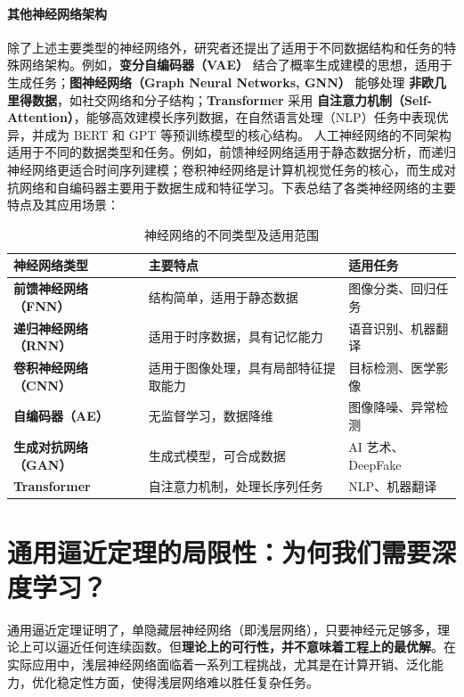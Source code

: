 \paragraph*{其他神经网络架构}
除了上述主要类型的神经网络外，研究者还提出了适用于不同数据结构和任务的特殊网络架构。例如，{\bf 变分自编码器（VAE）} 结合了概率生成建模的思想，适用于生成任务；{\bf 图神经网络（Graph Neural Networks, GNN）} 能够处理 {\bf 非欧几里得数据}，如社交网络和分子结构；{\bf Transformer }采用 {\bf 自注意力机制（Self-Attention）}，能够高效建模长序列数据，在自然语言处理（NLP）任务中表现优异，并成为 BERT 和 GPT 等预训练模型的核心结构。
人工神经网络的不同架构适用于不同的数据类型和任务。例如，前馈神经网络适用于静态数据分析，而递归神经网络更适合时间序列建模；卷积神经网络是计算机视觉任务的核心，而生成对抗网络和自编码器主要用于数据生成和特征学习。下表总结了各类神经网络的主要特点及其应用场景：
\begin{table}[htbp]
\centering
\caption{神经网络的不同类型及适用范围}
\small
\begin{tabular}{|p{3.5cm}|p{5cm}|p{4cm}|}
\hline
{\bf  神经网络类型} & {\bf  主要特点 } & {\bf 适用任务}  \\
\hline
{\bf 前馈神经网络（FNN）} &  结构简单，适用于静态数据  &  图像分类、回归任务  \\
\hline
{\bf 递归神经网络（RNN）}  &  适用于时序数据，具有记忆能力& 语音识别、机器翻译 \\
\hline
{\bf 卷积神经网络（CNN）}  & 适用于图像处理，具有局部特征提取能力&  目标检测、医学影像 \\
\hline
{\bf 自编码器（AE）}  &  无监督学习，数据降维 &  图像降噪、异常检测\\
\hline
{\bf 生成对抗网络（GAN）}  &  生成式模型，可合成数据 &  AI 艺术、DeepFake\\
\hline
{\bf Transformer}  &  自注意力机制，处理长序列任务  &  NLP、机器翻译\\
\hline
\end{tabular}
\label{神经网络的不同类型及适用范围}
\end{table}
\section{通用逼近定理的局限性：为何我们需要深度学习？}
通用逼近定理证明了，单隐藏层神经网络（即浅层网络），只要神经元足够多，理论上可以逼近任何连续函数。但{\bf 理论上的可行性，并不意味着工程上的最优解}。在实际应用中，浅层神经网络面临着一系列工程挑战，尤其是在计算开销、泛化能力，优化稳定性方面，使得浅层网络难以胜任复杂任务。

